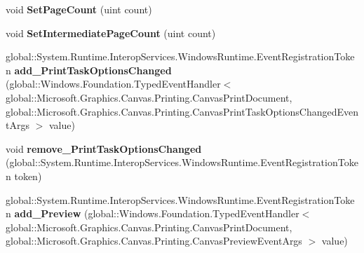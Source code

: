 \begin{DoxyCompactItemize}
void {\bfseries Set\+Page\+Count} (uint count)
\item 
\mbox{\label{interface_microsoft_1_1_graphics_1_1_canvas_1_1_printing_1_1_i_canvas_print_document_a7f760cb71cc746fd247a12e55ba416a1}} 
void {\bfseries Set\+Intermediate\+Page\+Count} (uint count)
\item 
\mbox{\label{interface_microsoft_1_1_graphics_1_1_canvas_1_1_printing_1_1_i_canvas_print_document_a1de4b2e4a0bbe65d5a50f8cfd5b275ff}} 
global\+::\+System.\+Runtime.\+Interop\+Services.\+Windows\+Runtime.\+Event\+Registration\+Token {\bfseries add\+\_\+\+Print\+Task\+Options\+Changed} (global\+::\+Windows.\+Foundation.\+Typed\+Event\+Handler$<$ global\+::\+Microsoft.\+Graphics.\+Canvas.\+Printing.\+Canvas\+Print\+Document, global\+::\+Microsoft.\+Graphics.\+Canvas.\+Printing.\+Canvas\+Print\+Task\+Options\+Changed\+Event\+Args $>$ value)
\item 
\mbox{\label{interface_microsoft_1_1_graphics_1_1_canvas_1_1_printing_1_1_i_canvas_print_document_a1da96a2ebf4b67369628fa017a384b71}} 
void {\bfseries remove\+\_\+\+Print\+Task\+Options\+Changed} (global\+::\+System.\+Runtime.\+Interop\+Services.\+Windows\+Runtime.\+Event\+Registration\+Token token)
\item 
\mbox{\label{interface_microsoft_1_1_graphics_1_1_canvas_1_1_printing_1_1_i_canvas_print_document_abaff1fcd43de732d25ae88fef48a23a9}} 
global\+::\+System.\+Runtime.\+Interop\+Services.\+Windows\+Runtime.\+Event\+Registration\+Token {\bfseries add\+\_\+\+Preview} (global\+::\+Windows.\+Foundation.\+Typed\+Event\+Handler$<$ global\+::\+Microsoft.\+Graphics.\+Canvas.\+Printing.\+Canvas\+Print\+Document, global\+::\+Microsoft.\+Graphics.\+Canvas.\+Printing.\+Canvas\+Preview\+Event\+Args $>$ value)
\item 
\mbox{\label{interface_microsoft_1_1_graphics_1_1_canvas_1_1_printing_1_1_i_canvas_print_document_a86ed67a2bf892a9f75d0f01ef8fa6436}} 

\end{DoxyCompactItemize}
